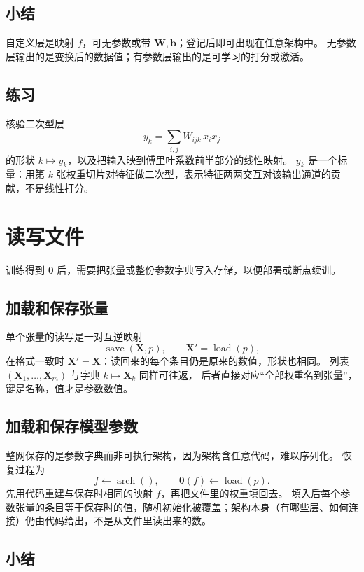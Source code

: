 \subsection{小结}

自定义层是映射 $f$，可无参数或带 $\bm{W},\bm{b}$；登记后即可出现在任意架构中。
无参数层输出的是变换后的数据值；有参数层输出的是可学习的打分或激活。

\subsection{练习}

核验二次型层
\[
y_k=\sum_{i,j}W_{ijk}\,x_i x_j
\]
的形状 $k\mapsto y_k$，以及把输入映到傅里叶系数前半部分的线性映射。
$y_k$ 是一个标量：用第 $k$ 张权重切片对特征做二次型，表示特征两两交互对该输出通道的贡献，不是线性打分。

\section{读写文件}

训练得到 $\bm{\theta}$ 后，需要把张量或整份参数字典写入存储，以便部署或断点续训。

\subsection{加载和保存张量}

单个张量的读写是一对互逆映射
\[
\operatorname{save}(\bm{X},p),\qquad
\bm{X}'=\operatorname{load}(p),
\]
在格式一致时 $\bm{X}'=\bm{X}$：读回来的每个条目仍是原来的数值，形状也相同。
列表 $(\bm{X}_1,\ldots,\bm{X}_m)$ 与字典 $k\mapsto\bm{X}_k$ 同样可往返，
后者直接对应“全部权重名到张量”，键是名称，值才是参数数值。

\subsection{加载和保存模型参数}

整网保存的是参数字典而非可执行架构，因为架构含任意代码，难以序列化。
恢复过程为
\[
f\leftarrow \operatorname{arch}(),
\qquad
\bm{\theta}(f)\leftarrow \operatorname{load}(p).
\]
先用代码重建与保存时相同的映射 $f$，再把文件里的权重填回去。
填入后每个参数张量的条目等于保存时的值，随机初始化被覆盖；架构本身（有哪些层、如何连接）仍由代码给出，不是从文件里读出来的数。

\subsection{小结}

